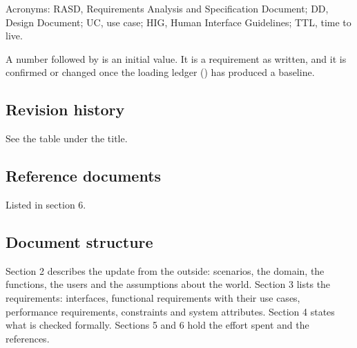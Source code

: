 \noindent Acronyms: RASD, Requirements Analysis and Specification Document; DD, Design
Document; UC, use case; HIG, Human Interface Guidelines; TTL, time to live.

\noindent A number followed by \initial{} is an initial value. It is a requirement as
written, and it is confirmed or changed once the loading ledger () has
produced a baseline.

\subsection{Revision history}
See the table under the title.

\subsection{Reference documents}
Listed in section 6.

\subsection{Document structure}
Section 2 describes the update from the outside: scenarios, the domain, the
functions, the users and the assumptions about the world. Section 3 lists the
requirements: interfaces, functional requirements with their use cases, performance
requirements, constraints and system attributes. Section 4 states what is checked
formally. Sections 5 and 6 hold the effort spent and the references.
